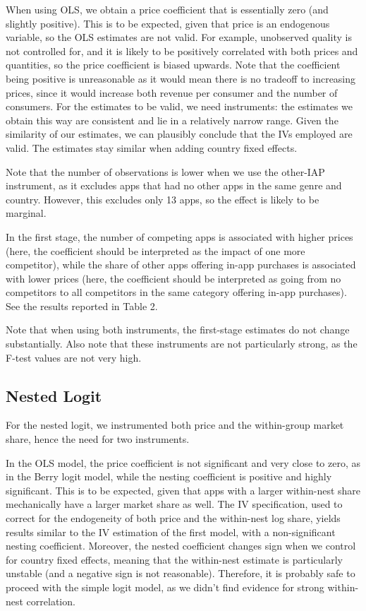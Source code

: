 \documentclass{article}
\begin{document}


When using OLS, we obtain a price coefficient that is essentially zero (and slightly positive). This is to be expected, given that price is an endogenous variable, so the OLS estimates are not valid. For example, unobserved quality is not controlled for, and it is likely to be positively correlated with both prices and quantities, so the price coefficient is biased upwards. Note that the coefficient being positive is unreasonable as it would mean there is no tradeoff to increasing prices, since it would increase both revenue per consumer and the number of consumers. For the estimates to be valid, we need instruments: the estimates we obtain this way are consistent and lie in a relatively narrow range. Given the similarity of our estimates, we can plausibly conclude that the IVs employed are valid. The estimates stay similar when adding country fixed effects.

Note that the number of observations is lower when we use the other-IAP instrument, as it excludes apps that had no other apps in the same genre and country. However, this excludes only 13 apps, so the effect is likely to be marginal.


In the first stage, the number of competing apps is associated with higher prices (here, the coefficient should be interpreted as the impact of one more competitor), while the share of other apps offering in-app purchases is associated with lower prices (here, the coefficient should be interpreted as going from no competitors to all competitors in the same category offering in-app purchases). See the results reported in Table 2.

Note that when using both instruments, the first-stage estimates do not change substantially. Also note that these instruments are not particularly strong, as the F-test values are not very high.


\subsection{Nested Logit}

For the nested logit, we instrumented both price and the within-group market share, hence the need for two instruments.



In the OLS model, the price coefficient is not significant and very close to zero, as in the Berry logit model, while the nesting coefficient is positive and highly significant. This is to be expected, given that apps with a larger within-nest share mechanically have a larger market share as well. The IV specification, used to correct for the endogeneity of both price and the within-nest log share, yields results similar to the IV estimation of the first model, with a non-significant nesting coefficient. Moreover, the nested coefficient changes sign when we control for country fixed effects, meaning that the within-nest estimate is particularly unstable (and a negative sign is not reasonable).  Therefore, it is probably safe to proceed with the simple logit model, as we didn't find evidence for strong within-nest correlation. 
\end{document}
